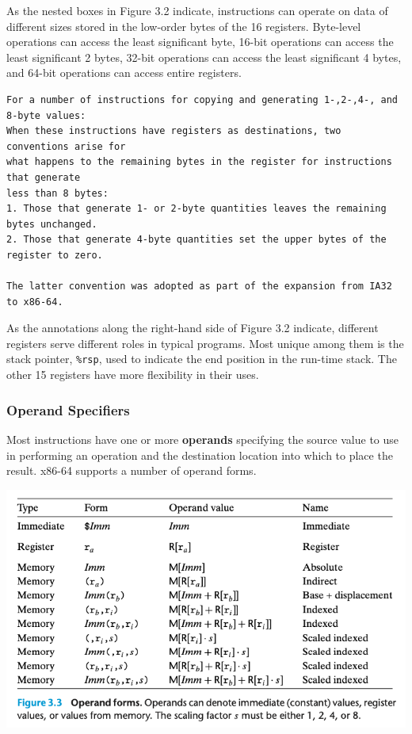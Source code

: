 \documentclass[11pt]{article}
\begin{document}
As the nested boxes in Figure 3.2 indicate, instructions can operate on data of different sizes stored in the low-order bytes of the 16 registers. Byte-level operations can access the least significant byte, 16-bit operations can access the least significant 2 bytes, 32-bit operations can access the least significant 4 bytes, and 64-bit operations can access entire registers.\\


\begin{verbatim}
For a number of instructions for copying and generating 1-,2-,4-, and 8-byte values:
When these instructions have registers as destinations, two conventions arise for 
what happens to the remaining bytes in the register for instructions that generate
less than 8 bytes:
1. Those that generate 1- or 2-byte quantities leaves the remaining bytes unchanged.
2. Those that generate 4-byte quantities set the upper bytes of the register to zero.

The latter convention was adopted as part of the expansion from IA32 to x86-64.
\end{verbatim}

As the annotations along the right-hand side of Figure 3.2 indicate, different registers serve different roles in typical programs. Most unique among them is the stack pointer, \texttt{\%rsp}, used to indicate the end position in the run-time stack. The other 15 registers have more flexibility in their uses.\\


\subsubsection{Operand Specifiers}
\label{sec:org1233503}
Most instructions have one or more \textbf{operands} specifying the source value to use in performing an operation and the destination location into which to place the result. x86-64 supports a number of operand forms.\\


\begin{center}
\includegraphics[width=.9\linewidth]{pics/operand-forms.png}
\end{center}
\end{document}
